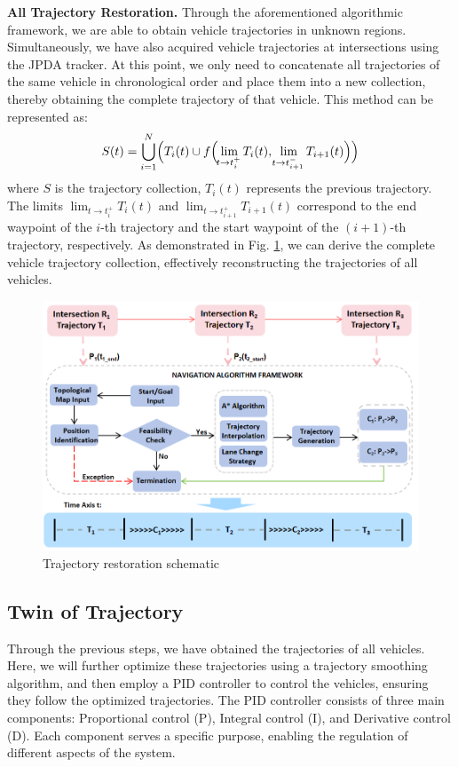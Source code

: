 \documentclass[lettersize,journal]{IEEEtran}
\begin{document}
\textbf{All Trajectory Restoration.}
Through the aforementioned algorithmic framework, we are able to obtain vehicle trajectories in unknown regions. 
Simultaneously, we have also acquired vehicle trajectories at intersections using the JPDA tracker. 
At this point, we only need to concatenate all trajectories of the same vehicle in chronological order and place them into a new collection, thereby obtaining the complete trajectory of that vehicle. 
This method can be represented as: 
\begin{align}
	S(t) = \bigcup_{i=1}^{N} \Bigl( T_i(t) \cup f\Bigl( \lim_{\!t \to t_i^+} T_i(t), \lim_{\!t \to t_{i+1}^-} T_{i+1}(t) \Bigr) \Bigr)
\end{align}
where $S$ is the trajectory collection, $T_i(t)$ represents the previous trajectory. 
The limits $\lim_{t \to t_i^+} T_i(t)$ and $\lim_{t \to t_{i+1}^+} T_{i+1}(t)$ correspond to the end waypoint of the $i$-th trajectory and the start waypoint of the $(i+1)$-th trajectory, respectively.
As demonstrated in Fig. \ref{fig:3}, we can derive the complete vehicle trajectory collection, effectively reconstructing the trajectories of all vehicles.
\begin{figure}[t]
	\centering
	\includegraphics[width=\linewidth]{picture/picture3.png} 
	\caption{Trajectory restoration schematic} 
	\label{fig:3} 
\end{figure}

\subsection{Twin of Trajectory}

Through the previous steps, we have obtained the trajectories of all vehicles. 
Here, we will further optimize these trajectories using a trajectory smoothing algorithm, and then employ a PID controller to control the vehicles, ensuring they follow the optimized trajectories\cite{Alpher22d}. 
The PID controller consists of three main components: Proportional control (P), Integral control (I), and Derivative control (D). Each component serves a specific purpose, enabling the regulation of different aspects of the system.
\end{document}
